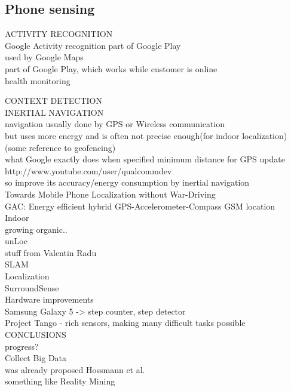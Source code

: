 \subsection{Phone sensing}
ACTIVITY RECOGNITION\\
	Google Activity recognition part of Google Play \cite{android:activityrecognition}\\
		used by Google Maps\\
		part of Google Play, which works while customer is online\\
		
	health monitoring
		

CONTEXT DETECTION\\
	INERTIAL NAVIGATION\\
		navigation usually done by GPS or Wireless communication\\
		but uses more energy and is often not precise enough(for indoor localization)\\
			(some reference to geofencing)\\
			 what Google exactly does when specified minimum distance for GPS update\\
			http://www.youtube.com/user/qualcommdev\\
		so improve its accuracy/energy consumption by inertial navigation\\
		Towards Mobile Phone Localization without War-Driving\cite{constandache:localization}\\
		GAC: Energy efficient hybrid GPS-Accelerometer-Compass GSM location\\
		Indoor\\
			growing organic..\\
			unLoc\\
			stuff from Valentin Radu\\
	
	SLAM\\

	Localization \\
		SurroundSense \cite{azizyan:surroundsense}\\

Hardware improvements\\
	Samsung Galaxy 5 -> step counter, step detector\\
	Project Tango - rich sensors, making many difficult tasks possible\cite{google:tango}\\

CONCLUSIONS\\
	progress?\\
	Collect Big Data\\
		was already proposed Hossmann et al.\cite{hossmann:bigdatasets}\\
		something like Reality Mining \cite{eagle:realitymining}\\
	
